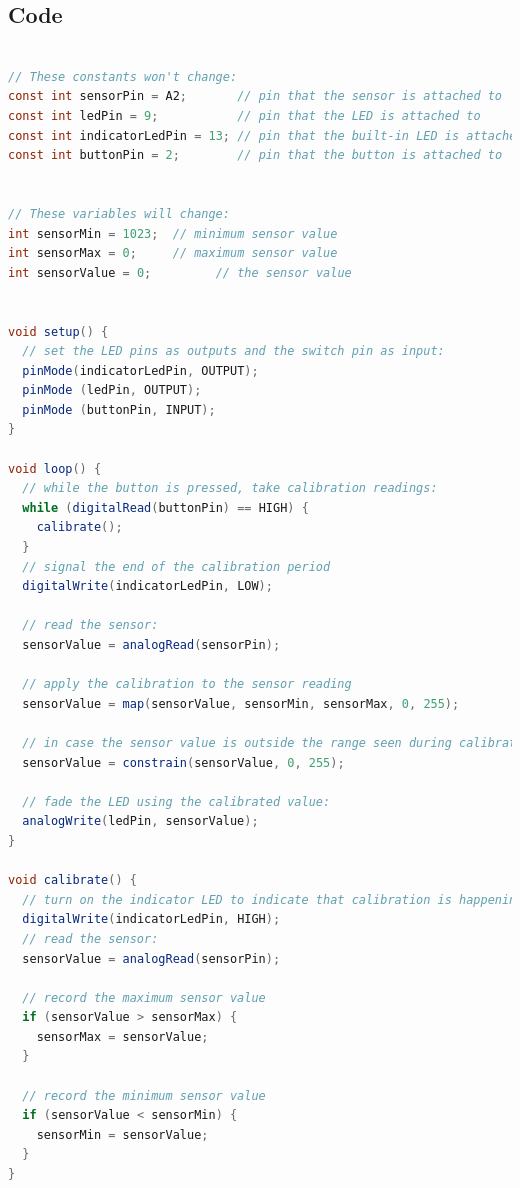 \documentclass[paper=a4, fontsize=11pt]{scrartcl}
\numberwithin{equation}{section}
\numberwithin{figure}{section}
\numberwithin{table}{section}
\begin{document}
\subsection{Code}

\begin{lstlisting}[language=java]

// These constants won't change:
const int sensorPin = A2;       // pin that the sensor is attached to
const int ledPin = 9;           // pin that the LED is attached to
const int indicatorLedPin = 13; // pin that the built-in LED is attached to
const int buttonPin = 2;        // pin that the button is attached to


// These variables will change:
int sensorMin = 1023;  // minimum sensor value
int sensorMax = 0;     // maximum sensor value
int sensorValue = 0;         // the sensor value


void setup() {
  // set the LED pins as outputs and the switch pin as input:
  pinMode(indicatorLedPin, OUTPUT);
  pinMode (ledPin, OUTPUT);
  pinMode (buttonPin, INPUT);
}

void loop() {
  // while the button is pressed, take calibration readings:
  while (digitalRead(buttonPin) == HIGH) {
    calibrate(); 
  }
  // signal the end of the calibration period
  digitalWrite(indicatorLedPin, LOW);  

  // read the sensor:
  sensorValue = analogRead(sensorPin);

  // apply the calibration to the sensor reading
  sensorValue = map(sensorValue, sensorMin, sensorMax, 0, 255);

  // in case the sensor value is outside the range seen during calibration
  sensorValue = constrain(sensorValue, 0, 255);

  // fade the LED using the calibrated value:
  analogWrite(ledPin, sensorValue);
}

void calibrate() {
  // turn on the indicator LED to indicate that calibration is happening:
  digitalWrite(indicatorLedPin, HIGH);
  // read the sensor:
  sensorValue = analogRead(sensorPin);

  // record the maximum sensor value
  if (sensorValue > sensorMax) {
    sensorMax = sensorValue;
  }

  // record the minimum sensor value
  if (sensorValue < sensorMin) {
    sensorMin = sensorValue;
  }
}
\end{lstlisting}

\end{document}

